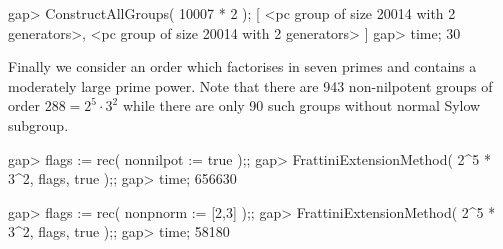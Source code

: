 gap> ConstructAllGroups( 10007 * 2 );
[ <pc group of size 20014 with 2 generators>, 
  <pc group of size 20014 with 2 generators> ]
gap> time;
30
\endexample

Finally we consider an order which factorises in seven primes and 
contains a moderately large prime power. Note that there are 943
non-nilpotent groups of order $288 = 2^5 \cdot 3^2$ while there
are only 90 such groups without normal Sylow subgroup.

\beginexample
gap> flags := rec( nonnilpot := true );;
gap> FrattiniExtensionMethod( 2^5 * 3^2, flags, true );;
gap> time;
656630

gap> flags := rec( nonpnorm := [2,3] );; 
gap> FrattiniExtensionMethod( 2^5 * 3^2, flags, true );;
gap> time;
58180
\endexample

